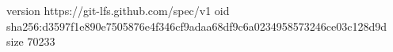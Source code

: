 version https://git-lfs.github.com/spec/v1
oid sha256:d3597f1e890e7505876e4f346cf9adaa68df9c6a0234958573246ce03c128d9d
size 70233
